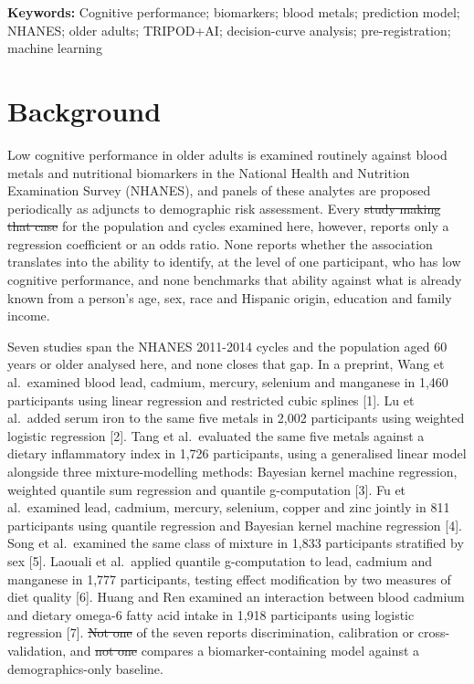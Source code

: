 \documentclass[12pt]{article}
\providecommand{\DIFaddtex}[1]{{\protect\color{blue}\uwave{#1}}} %
\providecommand{\DIFdeltex}[1]{{\protect\color{red}\sout{#1}}} %
\providecommand{\DIFaddbegin}{} %
\providecommand{\DIFaddend}{} %
\providecommand{\DIFdelbegin}{} %
\providecommand{\DIFdelend}{} %
\providecommand{\DIFadd}[1]{\texorpdfstring{\DIFaddtex{#1}}{#1}} %
\providecommand{\DIFdel}[1]{\texorpdfstring{\DIFdeltex{#1}}{}} %
\providecommand{\DIFscaledelfig}{0.5}
\newlength{\DIFdelgraphicswidth} %
\newlength{\DIFdelgraphicsheight} %
\providecommand{\DIFaddincludegraphics}[2][]{{\color{blue}\fbox{\DIFOincludegraphics[#1]{#2}}}} %
\providecommand{\DIFdelincludegraphics}[2][]{%
\sbox{\DIFdelgraphicsbox}{\DIFOincludegraphics[#1]{#2}}%
\settoboxwidth{\DIFdelgraphicswidth}{\DIFdelgraphicsbox} %
\settoboxtotalheight{\DIFdelgraphicsheight}{\DIFdelgraphicsbox} %
\scalebox{\DIFscaledelfig}{%
\parbox[b]{\DIFdelgraphicswidth}{\usebox{\DIFdelgraphicsbox}\\[-\baselineskip] \rule{\DIFdelgraphicswidth}{0em}}\llap{\resizebox{\DIFdelgraphicswidth}{\DIFdelgraphicsheight}{%
\setlength{\unitlength}{\DIFdelgraphicswidth}%
\begin{picture}(1,1)%
\thicklines\linethickness{2pt} %
{\color[rgb]{1,0,0}\put(0,0){\framebox(1,1){}}}%
{\color[rgb]{1,0,0}\put(0,0){\line( 1,1){1}}}%
{\color[rgb]{1,0,0}\put(0,1){\line(1,-1){1}}}%
\end{picture}%
}\hspace*{3pt}}} %
} %
\DeclareRobustCommand{\DIFaddbegin}{\DIFOaddbegin \let\includegraphics\DIFaddincludegraphics} %
\DeclareRobustCommand{\DIFaddend}{\DIFOaddend \let\includegraphics\DIFOincludegraphics} %
\DeclareRobustCommand{\DIFdelbegin}{\DIFOdelbegin \let\includegraphics\DIFdelincludegraphics} %
\DeclareRobustCommand{\DIFdelend}{\DIFOaddend \let\includegraphics\DIFOincludegraphics} %
\begin{document}
\medskip
\noindent\textbf{Keywords:} Cognitive performance; biomarkers; blood metals; prediction model; NHANES; older adults; TRIPOD+AI; decision-curve analysis; pre-registration; machine learning

\clearpage

\section*{Background}

Low cognitive performance in older adults is examined routinely against blood metals and nutritional biomarkers in the National Health and Nutrition Examination Survey (NHANES), and panels of these analytes are proposed periodically as adjuncts to demographic risk assessment. Every \DIFdelbegin \DIFdel{study making that case }\DIFdelend \DIFaddbegin \DIFadd{association study we identified }\DIFaddend for the population and cycles examined here, however, reports only a regression coefficient or an odds ratio. None reports whether the association translates into the ability to identify, at the level of one participant, who has low cognitive performance, and none benchmarks that ability against what is already known from a person's age, sex, race and Hispanic origin, education and family income.

Seven studies span the NHANES 2011-2014 cycles and the population aged 60 years or older analysed here, and none closes that gap. In a preprint, Wang et al.\ examined blood lead, cadmium, mercury, selenium and manganese in 1,460 participants using linear regression and restricted cubic splines [1]. Lu et al.\ added serum iron to the same five metals in 2,002 participants using weighted logistic regression [2]. Tang et al.\ evaluated the same five metals against a dietary inflammatory index in 1,726 participants, using a generalised linear model alongside three mixture-modelling methods: Bayesian kernel machine regression, weighted quantile sum regression and quantile g-computation [3]. Fu et al.\ examined lead, cadmium, mercury, selenium, copper and zinc jointly in 811 participants using quantile regression and Bayesian kernel machine regression [4]. Song et al.\ examined the same class of mixture in 1,833 participants stratified by sex [5]. Laouali et al.\ applied quantile g-computation to lead, cadmium and manganese in 1,777 participants, testing effect modification by two measures of diet quality [6]. Huang and Ren examined an interaction between blood cadmium and dietary omega-6 fatty acid intake in 1,918 participants using logistic regression [7]. \DIFdelbegin \DIFdel{Not one }\DIFdelend \DIFaddbegin \DIFadd{None }\DIFaddend of the seven reports discrimination, calibration or cross-validation, and \DIFdelbegin \DIFdel{not one }\DIFdelend \DIFaddbegin \DIFadd{none }\DIFaddend compares a biomarker-containing model against a demographics-only baseline.
\end{document}
